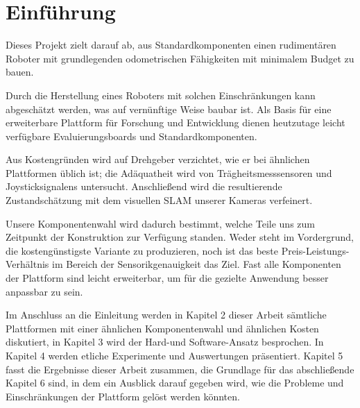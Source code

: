\documentclass[class=report, crop=false]{standalone}
\begin{document}
\chapter{Einführung}\label{cha:einfuhrung}

Dieses Projekt zielt darauf ab, aus Standardkomponenten einen rudimentären Roboter mit grundlegenden odometrischen Fähigkeiten mit minimalem Budget zu bauen.

Durch die Herstellung eines Roboters mit solchen Einschränkungen kann abgeschätzt werden, was auf vernünftige Weise baubar ist.
Als Basis für eine erweiterbare Plattform für Forschung und Entwicklung dienen heutzutage leicht verfügbare Evaluierungsboards und Standardkomponenten.

Aus Kostengründen wird auf Drehgeber verzichtet, wie er bei ähnlichen Plattformen üblich ist; die Adäquatheit wird von Trägheitsmesssensoren und Joysticksignalens untersucht. Anschließend wird die resultierende Zustandschätzung mit dem visuellen SLAM unserer Kameras verfeinert.

Unsere Komponentenwahl wird dadurch bestimmt, welche Teile uns zum Zeitpunkt der Konstruktion zur Verfügung standen. Weder steht im Vordergrund, die kostengünstigste Variante zu produzieren, noch ist das beste Preis-Leistungs-Verhältnis im Bereich der Sensorikgenauigkeit das Ziel. Fast alle Komponenten der Plattform sind leicht erweiterbar, um für die gezielte Anwendung besser anpassbar zu sein.

Im Anschluss an die Einleitung werden in Kapitel 2 dieser Arbeit sämtliche Plattformen mit einer ähnlichen Komponentenwahl und ähnlichen Kosten diskutiert, in Kapitel 3 wird der Hard-und Software-Ansatz besprochen. In Kapitel 4 werden etliche Experimente und Auswertungen präsentiert. Kapitel 5 fasst die Ergebnisse dieser Arbeit zusammen, die Grundlage für das abschließende Kapitel 6 sind, in dem ein Ausblick darauf gegeben wird, wie die Probleme und Einschränkungen der Plattform gelöst werden könnten.
\end{document}
